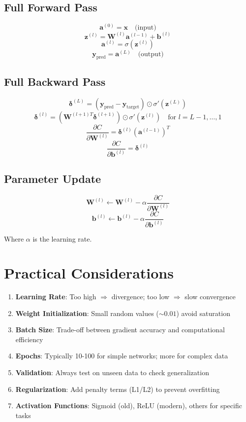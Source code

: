 \documentclass[11pt,a4paper]{article}
\begin{document}
\subsection{Full Forward Pass}
\[
\mathbf{a}^{(0)} = \mathbf{x} \quad \text{(input)}
\]
\[
\mathbf{z}^{(l)} = \mathbf{W}^{(l)} \mathbf{a}^{(l-1)} + \mathbf{b}^{(l)}
\]
\[
\mathbf{a}^{(l)} = \sigma(\mathbf{z}^{(l)})
\]
\[
\mathbf{y}_{\text{pred}} = \mathbf{a}^{(L)} \quad \text{(output)}
\]

\subsection{Full Backward Pass}
\[
\boldsymbol{\delta}^{(L)} = (\mathbf{y}_{\text{pred}} - \mathbf{y}_{\text{target}}) \odot \sigma'(\mathbf{z}^{(L)})
\]
\[
\boldsymbol{\delta}^{(l)} = (\mathbf{W}^{(l+1)T} \boldsymbol{\delta}^{(l+1)}) \odot \sigma'(\mathbf{z}^{(l)}) \quad \text{for } l = L-1, \ldots, 1
\]
\[
\frac{\partial C}{\partial \mathbf{W}^{(l)}} = \boldsymbol{\delta}^{(l)} (\mathbf{a}^{(l-1)})^T
\]
\[
\frac{\partial C}{\partial \mathbf{b}^{(l)}} = \boldsymbol{\delta}^{(l)}
\]

\subsection{Parameter Update}
\[
\mathbf{W}^{(l)} \leftarrow \mathbf{W}^{(l)} - \alpha \frac{\partial C}{\partial \mathbf{W}^{(l)}}
\]
\[
\mathbf{b}^{(l)} \leftarrow \mathbf{b}^{(l)} - \alpha \frac{\partial C}{\partial \mathbf{b}^{(l)}}
\]

Where $\alpha$ is the learning rate.

\newpage

\section{Practical Considerations}

\begin{enumerate}
    \item \textbf{Learning Rate}: Too high $\Rightarrow$ divergence; too low $\Rightarrow$ slow convergence
    \item \textbf{Weight Initialization}: Small random values ($\sim 0.01$) avoid saturation
    \item \textbf{Batch Size}: Trade-off between gradient accuracy and computational efficiency
    \item \textbf{Epochs}: Typically 10-100 for simple networks; more for complex data
    \item \textbf{Validation}: Always test on unseen data to check generalization
    \item \textbf{Regularization}: Add penalty terms (L1/L2) to prevent overfitting
    \item \textbf{Activation Functions}: Sigmoid (old), ReLU (modern), others for specific tasks
\end{enumerate}
\end{document}
